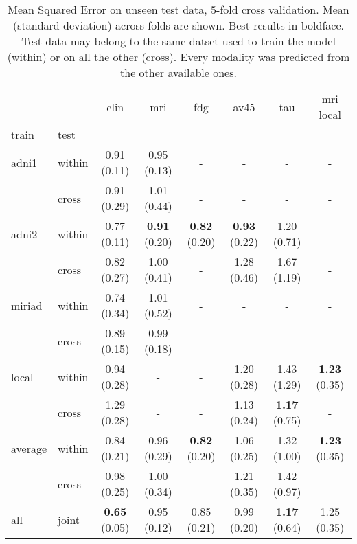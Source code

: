 \begin{table}[!t]
\caption{
Mean Squared Error on unseen test data, $5$-fold cross validation.
Mean (standard deviation) across folds are shown. Best results in boldface.
Test data may belong to the same datset used to train the model (within) or on all the other (cross).
Every modality was predicted from the other available ones.
}
\centering
\begin{tabular}{llcccccc}
\toprule
             &       &         clin &          mri &          fdg &         av45 &          tau &   mri local \\
train & test &              &              &              &              &              &              \\
\midrule
adni1 & within &  0.91 (0.11) &  0.95 (0.13) &            - &            - &            - &            - \\
             & cross &  0.91 (0.29) &  1.01 (0.44) &            - &            - &            - &            - \\
\midrule
adni2 & within &  0.77 (0.11) &  \textbf{0.91} (0.20) &  \textbf{0.82} (0.20) &  \textbf{0.93} (0.22) &  1.20 (0.71) &            - \\
             & cross &  0.82 (0.27) &  1.00 (0.41) &            - &  1.28 (0.46) &  1.67 (1.19) &            - \\
\midrule
miriad & within &  0.74 (0.34) &  1.01 (0.52) &            - &            - &            - &            - \\
             & cross &  0.89 (0.15) &  0.99 (0.18) &            - &            - &            - &            - \\
\midrule
local & within &  0.94 (0.28) &            - &            - &  1.20 (0.28) &  1.43 (1.29) &  \textbf{1.23} (0.35) \\
             & cross &  1.29 (0.28) &            - &            - &  1.13 (0.24) &  \textbf{1.17} (0.75) &            - \\
\midrule
\midrule
average & within &  0.84 (0.21) &  0.96 (0.29) &  \textbf{0.82} (0.20) &  1.06 (0.25) &  1.32 (1.00) &  \textbf{1.23} (0.35) \\
        & cross  &  0.98 (0.25) &  1.00 (0.34) &            - &  1.21 (0.35) &  1.42 (0.97) &            - \\
\midrule
\midrule
all       & joint &  \textbf{0.65} (0.05) &  0.95 (0.12) &  0.85 (0.21) &  0.99 (0.20) &  \textbf{1.17} (0.64) &  1.25 (0.35) \\
\bottomrule
\end{tabular}
\label{table:crossvalidation_details}
\end{table}

